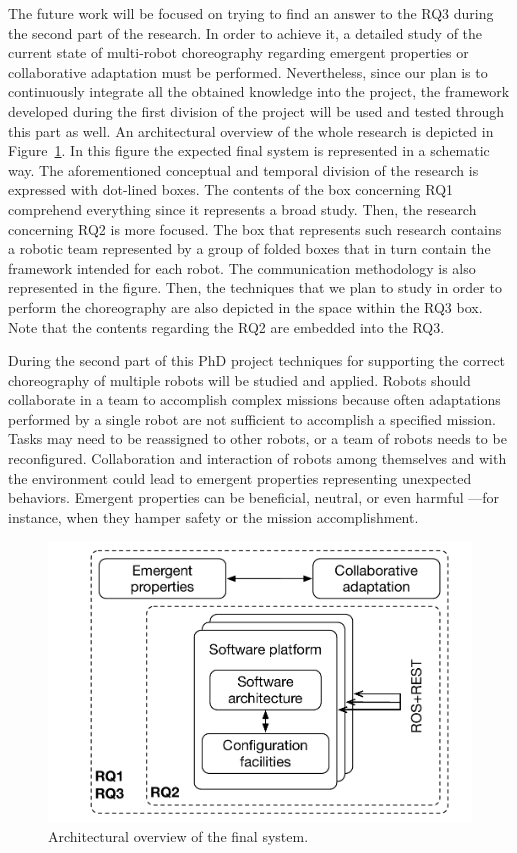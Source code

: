The future work will be focused on trying to find an answer to the RQ3 during the second part of the research.
In order to achieve it, a detailed study of the current state of multi-robot choreography regarding emergent properties or collaborative adaptation must be performed.
Nevertheless, since our plan is to continuously integrate all the obtained knowledge into the project, the framework developed during the first division of the project will be used and tested through this part as well.
An architectural overview of the whole research is depicted in Figure~\ref{fig:overview}.
In this figure the expected final system is represented in a schematic way.
The aforementioned conceptual and temporal division of the research is expressed with dot-lined boxes.
The contents of the box concerning RQ1 comprehend everything since it represents a broad study.
Then, the research concerning RQ2 is more focused.
The box that represents such research contains a robotic team represented by a group of folded boxes that in turn contain the framework intended for each robot.
The communication methodology is also represented in the figure.
Then, the techniques that we plan to study in order to perform the choreography are also depicted in the space within the RQ3 box.
Note that the contents regarding the RQ2 are embedded into the RQ3.

During the second part of this PhD project techniques for supporting the correct choreography of multiple robots will be studied and applied.
Robots should collaborate in a team to accomplish complex missions because often adaptations performed by a single robot are not sufficient to accomplish a specified mission. 
Tasks may need to be reassigned to other robots, or a team of robots needs to be reconfigured. 
Collaboration and interaction of robots among themselves and with the environment could lead to emergent properties representing unexpected behaviors. Emergent properties can be beneficial, neutral, or even harmful ---for instance, when they hamper safety or the mission accomplishment.

\begin{figure}[!t]
\begin{center}
\includegraphics[width=1\linewidth]{Figures/research.pdf}
\caption{Architectural overview of the final system.}
\label{fig:overview}
\end{center}
\end{figure}